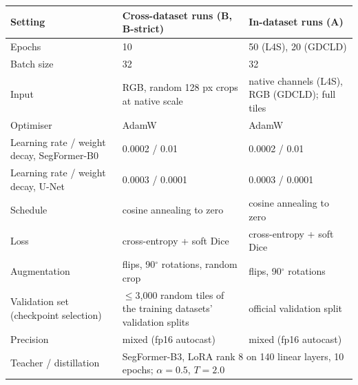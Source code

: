 \begin{tabular}{lll}
\toprule
Setting & Cross-dataset runs (B, B-strict) & In-dataset runs (A) \\
\midrule
Epochs & 10 & 50 (L4S), 20 (GDCLD) \\
Batch size & 32 & 32 \\
Input & RGB, random 128 px crops at native scale & native channels (L4S), RGB (GDCLD); full tiles \\
Optimiser & AdamW & AdamW \\
Learning rate / weight decay, SegFormer-B0 & 0.0002 / 0.01 & 0.0002 / 0.01 \\
Learning rate / weight decay, U-Net & 0.0003 / 0.0001 & 0.0003 / 0.0001 \\
Schedule & cosine annealing to zero & cosine annealing to zero \\
Loss & cross-entropy + soft Dice & cross-entropy + soft Dice \\
Augmentation & flips, 90$^\circ$ rotations, random crop & flips, 90$^\circ$ rotations \\
Validation set (checkpoint selection) & $\leq$3{,}000 random tiles of the training datasets' validation splits & official validation split \\
Precision & mixed (fp16 autocast) & mixed (fp16 autocast) \\
Teacher / distillation & \multicolumn{2}{l}{SegFormer-B3, LoRA rank 8 on 140 linear layers, 10 epochs; $\alpha=0.5$, $T=2.0$} \\
\bottomrule
\end{tabular}
